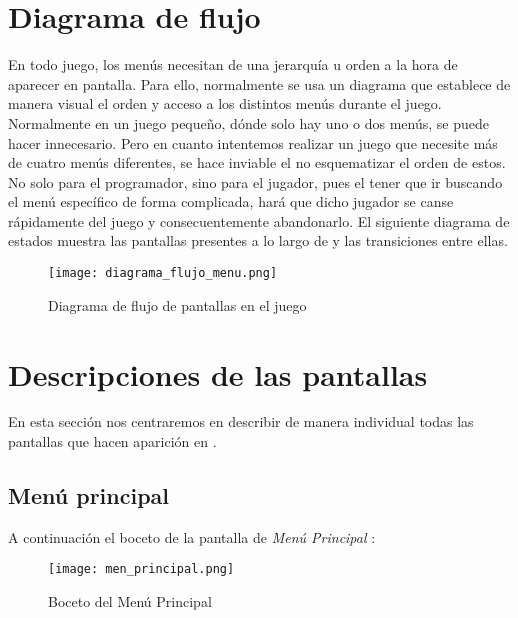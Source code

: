     \newpage
    \label{sec:diagrama-flujo-menus}
        \section{Diagrama de flujo}
        En todo juego, los menús necesitan de una jerarquía u orden a la hora de aparecer en pantalla. Para ello, normalmente se usa un diagrama que establece de manera visual el orden y acceso a los distintos menús durante el juego. Normalmente en un juego pequeño, dónde solo hay uno o dos menús, se puede hacer innecesario. Pero en cuanto intentemos realizar un juego que necesite más de cuatro menús diferentes, se hace inviable el no esquematizar el orden de estos. No solo para el programador, sino para el jugador, pues el tener que ir buscando el menú específico de forma complicada, hará que dicho jugador se canse rápidamente del juego y consecuentemente abandonarlo. El siguiente diagrama de estados muestra las pantallas presentes a lo largo de \nombrejuego y las transiciones entre ellas.
        
        \begin{figure}[H] 
                \begin{center}
                    \texttt{[image: diagrama\_flujo\_menu.png]}
                \end{center}
                \caption{Diagrama de flujo de pantallas en el juego}
                \label{fig:diagrama-flujo-menu}
            \end{figure}
        
        \newpage
        \section{Descripciones de las pantallas}
        En esta sección nos centraremos en describir de manera individual todas las pantallas que hacen aparición en \nombrejuego.
        
            \subsection{Menú principal}
            A continuación el boceto de la pantalla de \emph{Menú Principal} :
            
            \begin{figure}[H] 
                \begin{center}
                    \texttt{[image: men\_principal.png]}
                \end{center}
                \caption{Boceto del Menú Principal}
                \label{fig:menu-principal}
            \end{figure}
            
